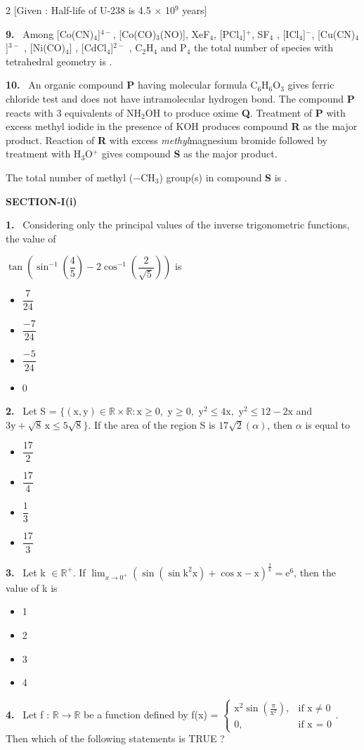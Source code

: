 \documentclass[10pt]{extarticle}
\newcommand{\papersec}[1]{\par\bigskip{\centering\Large\bfseries PAPER-#1\par}\medskip}
\newcommand{\partsec}[2]{\par\medskip\noindent{\large\bfseries PART-#1: #2}\par\smallskip}
\newcommand{\sect}[1]{\par\smallskip\noindent\textbf{#1}\par}
\newcommand{\qn}[1]{\par\smallskip\noindent\textbf{#1.}~}
\newenvironment{qoptions}{\begin{itemize}[leftmargin=1.8em,itemsep=1pt,topsep=2pt,label={}]}{\end{itemize}}
\newcommand{\opt}[2]{\item[(#1)] #2}
\begin{document}
\begin{multicols}{2}
[Given : Half-life of U-238 is 4.5 $\times$ 10$^9$ years]
\qn{9} Among [Co(CN)$_4$]$^{4-}$, [Co(CO)$_3$(NO)], XeF$_4$, [PCl$_4$]$^+$, SF$_4$ , [ICl$_4$]$^-$, [Cu(CN)$_4$]$^{3-}$ , [Ni(CO)$_4$] , [CdCl$_4$]$^{2-}$ , C$_2$H$_4$ and P$_4$ the total number of species with tetrahedral geometry is \underline{\hspace{1.5cm}}.
\qn{10} An organic compound \textbf P having molecular formula C$_6$H$_6$O$_3$ gives ferric chloride test and does not have intramolecular hydrogen bond. The compound \textbf P reacts with 3 equivalents of NH$_2$OH to produce oxime \textbf Q. Treatment of \textbf P with excess methyl iodide in the presence of KOH produces compound \textbf R as the major product. Reaction of \textbf R with excess \textit{methyl}magnesium bromide followed by treatment with H$_3$O$^+$ gives compound \textbf S as the major product.\par
The total number of methyl ($-$CH$_3$) group(s) in compound \textbf S is \underline{\hspace{1.5cm}}.
\raggedcolumns
\papersec{2}
\partsec{3}{MATHEMATICS}
\sect{SECTION-I(i)}
\qn{1} Considering only the principal values of the inverse trigonometric functions, the value of\par
$\tan\left(\sin^{-1}\left(\dfrac45\right)-2\cos^{-1}\left(\dfrac2{\sqrt5}\right)\right)$ is
\begin{qoptions}
\opt{A}{$\dfrac7{24}$}
\opt{B}{$\dfrac{-7}{24}$}
\opt{C}{$\dfrac{-5}{24}$}
\opt{D}{0}
\end{qoptions}
\qn{2} Let S = $\bigl\{(\mathrm x,\mathrm y)\in\mathbb R\times\mathbb R:\mathrm x\geqslant0,$ $\mathrm y\geqslant0,$ $\mathrm y^2\leqslant4\mathrm x,$ $\mathrm y^2\leqslant12-2\mathrm x$ and $3\mathrm y+\sqrt8\,\mathrm x\leqslant5\sqrt8\bigr\}$. If the area of the region S is $17\sqrt2(\alpha)$, then $\alpha$ is equal to
\begin{qoptions}
\opt{A}{$\dfrac{17}2$}
\opt{B}{$\dfrac{17}4$}
\opt{C}{$\dfrac13$}
\opt{D}{$\dfrac{17}3$}
\end{qoptions}
\qn{3} Let k $\in\mathbb R^+$. If $\displaystyle\lim_{x\to0^+}\left(\sin\left(\sin\mathrm k^2\mathrm x\right)+\cos\mathrm x-\mathrm x\right)^{\frac2{\mathrm x}}=\mathrm e^6$, then the value of k is
\begin{qoptions}
\opt{A}{1}
\opt{B}{2}
\opt{C}{3}
\opt{D}{4}
\end{qoptions}
\qn{4} Let f : $\mathbb R\to\mathbb R$ be a function defined by f(x) = $\begin{cases}\mathrm x^2\sin\left(\frac\pi{\mathrm x^2}\right),&\text{if x}\neq0\\0,&\text{if x = 0}\end{cases}$. Then which of the following statements is TRUE ?

\end{multicols}
\end{document}
